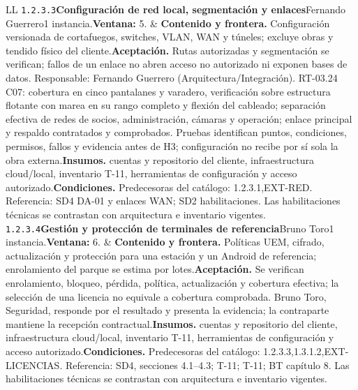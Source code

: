 \begin{longtable}{L{\tabcolsep\relax}L{\tabcolsep\relax}}
\texttt{1.\allowbreak{}2.\allowbreak{}3.\allowbreak{}3}\newline{}\textbf{Configuración de red local, segmentación y enlaces}\newline{}Fernando Guerrero\newline{}1 instancia.\newline{}\textbf{Ventana:} 5. & \textbf{Contenido y frontera.} Configuración versionada de cortafuegos, switches, VLAN, WAN y túneles; excluye obras y tendido físico del cliente.\newline{}\textbf{Aceptación.} Rutas autorizadas y segmentación se verifican; fallos de un enlace no abren acceso no autorizado ni exponen bases de datos. Responsable: Fernando Guerrero (Arquitectura/Integración). RT-03.24 C07: cobertura en cinco pantalanes y varadero, verificación sobre estructura flotante con marea en su rango completo y flexión del cableado; separación efectiva de redes de socios, administración, cámaras y operación; enlace principal y respaldo contratados y comprobados. Pruebas identifican puntos, condiciones, permisos, fallos y evidencia antes de H3; configuración no recibe por sí sola la obra externa.\newline{}\textbf{Insumos.} cuentas y repositorio del cliente, infraestructura cloud/local, inventario T-11, herramientas de configuración y acceso autorizado.\newline{}\textbf{Condiciones.} Predecesoras del catálogo: 1.2.3.1,EXT-RED. Referencia: SD4 DA-01 y enlaces WAN; SD2 habilitaciones. Las habilitaciones técnicas se contrastan con arquitectura e inventario vigentes.\\\hline
\texttt{1.\allowbreak{}2.\allowbreak{}3.\allowbreak{}4}\newline{}\textbf{Gestión y protección de terminales de referencia}\newline{}Bruno Toro\newline{}1 instancia.\newline{}\textbf{Ventana:} 6. & \textbf{Contenido y frontera.} Políticas UEM, cifrado, actualización y protección para una estación y un Android de referencia; enrolamiento del parque se estima por lotes.\newline{}\textbf{Aceptación.} Se verifican enrolamiento, bloqueo, pérdida, política, actualización y cobertura efectiva; la selección de una licencia no equivale a cobertura comprobada. Bruno Toro, Seguridad, responde por el resultado y presenta la evidencia; la contraparte mantiene la recepción contractual.\newline{}\textbf{Insumos.} cuentas y repositorio del cliente, infraestructura cloud/local, inventario T-11, herramientas de configuración y acceso autorizado.\newline{}\textbf{Condiciones.} Predecesoras del catálogo: 1.2.3.3,1.3.1.2,EXT-LICENCIAS. Referencia: SD4, secciones 4.1--4.3; T-11; T-11; BT capítulo 8. Las habilitaciones técnicas se contrastan con arquitectura e inventario vigentes.\\\hline

\end{longtable}
